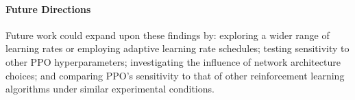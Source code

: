 \documentclass{article}
\begin{document}
\paragraph{Future Directions}
Future work could expand upon these findings by: exploring a wider range of learning rates or employing adaptive learning rate schedules; testing sensitivity to other PPO hyperparameters; investigating the influence of network architecture choices; and comparing PPO's sensitivity to that of other reinforcement learning algorithms under similar experimental conditions.

\end{document}
